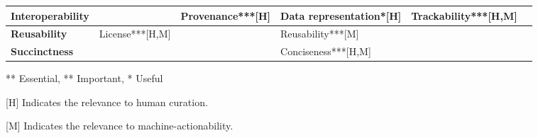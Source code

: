 \documentclass[runningheads]{llncs}
\begin{document}
\begin{landscape}
\begin{table}[t]
{\begin{tabular}{|@{}p{2.7cm}|p{3.9cm}|p{4.5cm}|p{3.4cm}|p{3.4cm}|p{3.4cm}@{}|}
\textbf{Interoperability} &  & Provenance***[H] & Data representation*[H] & Trackability***[H,M] &  \\ \hline
\textbf{Reusability} & License***[H,M] &  & Reusability***[M] &  &  \\ \hline
\textbf{Succinctness} &  &  & Conciseness***[H,M] &  &  \\ \bottomrule
\end{tabular}
}
{\vspace{2pt}\raggedright*** Essential, ** Important, * Useful\par}
{\vspace{2pt}\raggedright[H] Indicates the relevance to human curation.\par}
{\vspace{2pt}\raggedright[M] Indicates the relevance to machine-actionability.\par}
\end{table}
\end{landscape}
\end{document}
